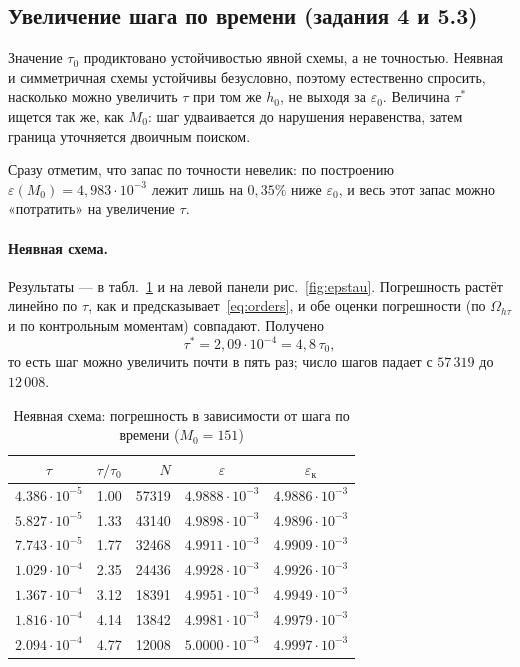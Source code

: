 \documentclass[12pt,a4paper]{article}
\begin{document}
\subsection{Увеличение шага по времени (задания 4 и 5.3)}
\label{sec:taustar}

Значение $\tau_0$ продиктовано устойчивостью явной схемы, а не
точностью. Неявная и симметричная схемы устойчивы безусловно, поэтому
естественно спросить, насколько можно увеличить $\tau$ при том же
$h_0$, не выходя за $\varepsilon_0$. Величина $\tau^*$ ищется так же,
как $M_0$: шаг удваивается до нарушения неравенства, затем граница
уточняется двоичным поиском.

Сразу отметим, что запас по точности невелик: по построению
$\varepsilon(M_0)=4{,}983\cdot10^{-3}$ лежит лишь на $0{,}35\%$ ниже
$\varepsilon_0$, и весь этот запас можно «потратить» на увеличение
$\tau$.

\paragraph{Неявная схема.} Результаты --- в табл.~\ref{tab:epstau_imp} и
на левой панели рис.~\ref{fig:epstau}. Погрешность растёт линейно по
$\tau$, как и предсказывает~\eqref{eq:orders}, и обе оценки погрешности
(по $\Omega_{h\tau}$ и по контрольным моментам) совпадают. Получено
\[
\tau^*=2{,}09\cdot10^{-4}=4{,}8\,\tau_0 ,
\]
то есть шаг можно увеличить почти в пять раз; число шагов падает с
$57\,319$ до $12\,008$.

\begin{table}[htbp]
\caption{Неявная схема: погрешность в зависимости от шага по времени
($M_0=151$)}
\label{tab:epstau_imp}
\centering
\begin{tabular}{c c r c c}
\toprule
$\tau$ & $\tau/\tau_0$ & $N$ & $\varepsilon$ &
$\varepsilon_{\text{к}}$\\
\midrule
$4.386\cdot10^{-5}$ & 1.00 & 57319 & $4.9888\cdot10^{-3}$ & $4.9886\cdot10^{-3}$ \\
$5.827\cdot10^{-5}$ & 1.33 & 43140 & $4.9898\cdot10^{-3}$ & $4.9896\cdot10^{-3}$ \\
$7.743\cdot10^{-5}$ & 1.77 & 32468 & $4.9911\cdot10^{-3}$ & $4.9909\cdot10^{-3}$ \\
$1.029\cdot10^{-4}$ & 2.35 & 24436 & $4.9928\cdot10^{-3}$ & $4.9926\cdot10^{-3}$ \\
$1.367\cdot10^{-4}$ & 3.12 & 18391 & $4.9951\cdot10^{-3}$ & $4.9949\cdot10^{-3}$ \\
$1.816\cdot10^{-4}$ & 4.14 & 13842 & $4.9981\cdot10^{-3}$ & $4.9979\cdot10^{-3}$ \\
$2.094\cdot10^{-4}$ & 4.77 & 12008 & $5.0000\cdot10^{-3}$ & $4.9997\cdot10^{-3}$ \\
\bottomrule
\end{tabular}
\end{table}
\end{document}
